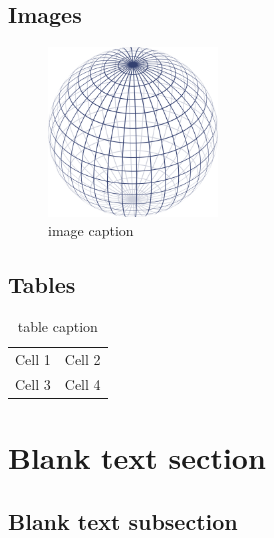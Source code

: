 \documentclass{tokaev-base}
\begin{document}
\subsection[short]{Images}

\begin{figure}[h]
    \centering
    \includegraphics[width=0.4\textwidth]{image-example.png}
    \caption{image caption}
\end{figure}

\subsection[short]{Tables}

\begin{center}
    \begin{table}[h!]
        \caption{table caption}
        \centering
        \begin{tabular}{|c|c|}
            \hline
            Cell 1 & Cell 2 \\
            Cell 3 & Cell 4 \\
            \hline
        \end{tabular}
    \end{table}
\end{center}

\newpage

\section{Blank text section}

\subsection[short]{Blank text subsection}

\lipsum[1-4]
\end{document}
